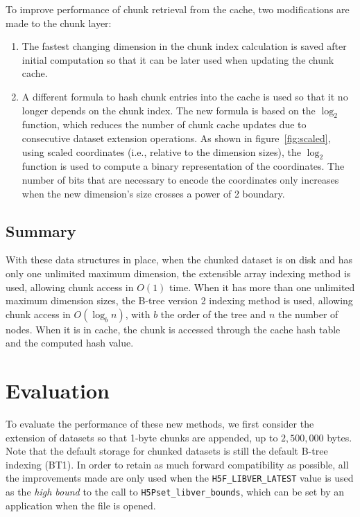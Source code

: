 To improve performance of chunk retrieval from the cache, two
modifications are made to the chunk layer:
\begin{enumerate}
\item The fastest changing dimension in the chunk index calculation is saved after
initial computation so that it can be later used when updating the chunk cache.
\item A different formula to hash chunk entries into the cache is used so that
it no longer depends on the chunk index. The new formula is based on the
$\log_2$ function, which reduces the number of chunk cache
updates due to consecutive dataset extension operations. As shown
in figure~\ref{fig:scaled}, using scaled coordinates (i.e., relative to the
dimension sizes), the $\log_2$ function is used to compute
a binary representation of the coordinates. The number of bits that are necessary
to encode the coordinates only increases when the new dimension's size crosses
a power of 2 boundary.
\end{enumerate}

\begin{figure*}
\centering

\caption{Example of hash-value computation that is used to retrieve chunks using
 scaled coordinates in a 3-dimensional dataset.}
\label{fig:scaled}
\end{figure*}

\subsection{Summary}

With these data structures in place, when the chunked dataset is on disk and
has only one unlimited maximum dimension, the extensible array indexing method is used,
allowing chunk access in $O(1)$ time. When it has more than one unlimited
maximum dimension sizes, the B-tree version 2 indexing method is used, allowing
chunk access in $O(\log_b{n})$, with $b$ the order of the tree and $n$ the
number of nodes. When it is in cache, the chunk is accessed through the cache
hash table and the computed hash value.

\section{Evaluation}
\label{sec:evaluation}

To evaluate the performance of these new methods, we first consider the extension
of datasets so that 1-byte chunks are appended, up to $2,500,000$ bytes.
Note that the default storage for chunked datasets is still the default
B-tree indexing (BT1). In order to retain as much forward compatibility as
possible, all the improvements made are only used when the
\texttt{H5F\_LIBVER\_LATEST} value is used as the \textit{high bound} to the
call to \texttt{H5Pset\_libver\_bounds}, which can be set by an application
when the file is opened.

